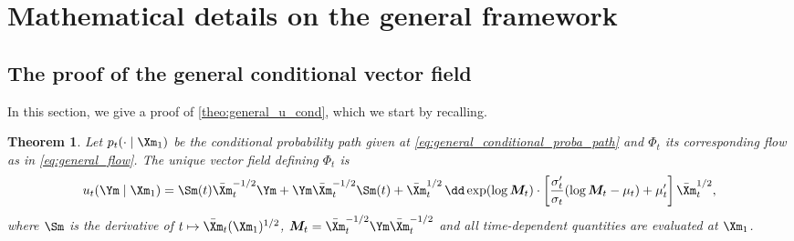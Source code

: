 \documentclass[10pt]{article} %
\theoremstyle{plain}
\newtheorem{theorem}{Theorem}[section]
\newtheorem{lemma}[theorem]{Lemma}
\theoremstyle{definition}
\theoremstyle{remark}
\begin{document}
\section{Mathematical details on the general framework}
\label{appendix:the_maths_general_framework}

\subsection{The proof of the general conditional vector field}
In this section, we give a proof of \cref{theo:general_u_cond}, which we start by recalling.
\begin{theorem}
  Let $p_t(\cdot \mid \Xm_1)$ be the conditional probability path  given at \cref{eq:general_conditional_proba_path}
  and $\Phi_t$ its corresponding flow as in \cref{eq:general_flow}.
  The unique vector field defining $\Phi_t$ is
  \begin{equation*}
    u_t(\Ym \mid \Xm_1) = \Sm(t)\bar{\Xm}_t^{-1/2}\Ym+ \Ym\bar{\Xm}_t^{-1/2}\Sm(t)+ \bar{\Xm}_t^{1/2}\,\dd\exp(\log \bm M_t)\cdot\left[\frac{\sigma_t'}{\sigma_t}(\log \bm M_t-\mu_t)+ \mu_t'\right]\bar{\Xm}_t^{1/2},
  \end{equation*}
  where $\Sm$ is the derivative of $t \mapsto \bar{\Xm}_t(\Xm_1)^{1/2}$, $\bm M_t=\bar{\Xm}_t^{-1/2}\Ym\bar{\Xm}_t^{-1/2}$ and all
  time-dependent quantities are evaluated at $\Xm_1$.
\end{theorem}
\end{document}
